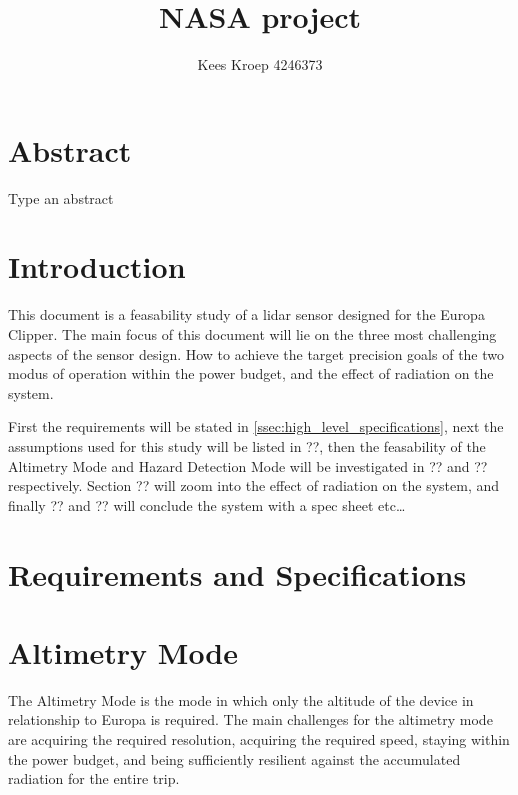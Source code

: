 \documentclass{article}
\title{NASA project}
\author{Kees Kroep 4246373}
\begin{document}
  \maketitle


\section*{Abstract}
Type an abstract

\clearpage
\tableofcontents
\clearpage

\section*{Introduction}
This document is a feasability study of a lidar sensor designed for the Europa Clipper. The main focus of this document will lie on the three most challenging aspects of the sensor design. How to achieve the target precision goals of the two modus of operation within the power budget, and the effect of radiation on the system.

First the requirements will be stated in \cref{ssec:high_level_specifications}, next the assumptions used for this study will be listed in ??,  then the feasability of the Altimetry Mode and Hazard Detection Mode will be investigated in ?? and ?? respectively. Section ?? will zoom into the effect of radiation on the system, and finally ?? and ?? will conclude the system with a spec sheet etc\dots

\section{Requirements and Specifications}\label{sec:requirements_and_specifications}

%




\section{Altimetry Mode}\label{sec:altimetry_mode}
The Altimetry Mode is the mode in which only the altitude of the device in relationship to Europa is required. The main challenges for the altimetry mode are acquiring the required resolution, acquiring the required speed, staying within the power budget, and being sufficiently resilient against the accumulated radiation for the entire trip.
\end{document}
